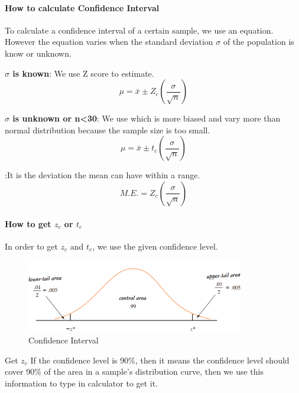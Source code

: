 \paragraph{How to calculate Confidence Interval} To calculate a confidence interval of a certain sample, we use an equation. However the equation varies when the standard deviation \(\sigma\) of the population is know or unknown.
\begin{description}
    \item \textbf{\(\sigma\) is known}:
    We use Z score to estimate.
    \begin{equation}
    \mu=\bar x \pm Z_{c} (\frac{\sigma}{\sqrt{n}} )
    \end{equation}
    \item \textbf{\(\sigma\) is unknown or n<30}:
    We use  which is more biased and vary more than normal distribution because the sample size is too small.
    \begin{equation}
    \mu=\bar x \pm t_{c} (\frac{\sigma}{\sqrt{n}} )
    \end{equation}
\end{description}

 :It is the deviation the mean can have within a range.
 \begin{equation}
   M.E.= Z_{c} (\frac{\sigma}{\sqrt{n}} )
\end{equation}
\paragraph{How to get \(z_c\) or \(t_c\)}In order to get \(z_c\) and \(t_c\), we use the given confidence level. 
\begin{figure}[H]
      \centering
    \includegraphics[width=95mm]{meanestimate.png}
    \caption{Confidence Interval}
    \label{Figure}
\end{figure}
\begin{examplebox}{Get \(z_c\)}
    If the confidence level is 90\%, then it means the confidence level should cover 90\% of the area in a sample's distribution curve, then we use this information to type in calculator to get it.
\end{examplebox}

